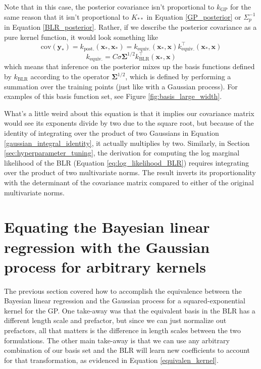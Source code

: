 \documentclass{article}
\begin{document}
Note that in this case, the posterior covariance isn't proportional to $k_\text{GP}$ for the same reason that it isn't proportional to $K_{\ast\ast}$ in Equation \ref{GP_posterior} or $\Sigma_p^{-1}$ in Equation \ref{BLR_posterior}. Rather, if we describe the posterior covariance as a pure kernel function, it would look something like 
\begin{equation}
    \text{cov}(\mathbf{y_\ast})= k_\text{post.}(\mathbf{x}_\ast,\mathbf{x}_\ast) =
    k_\text{equiv.}(\mathbf{x}_\ast,\mathbf{x}) k_\text{equiv.}^\top(\mathbf{x}_\ast,\mathbf{x})
\end{equation}\begin{equation}
\label{equivalen_kernel}
    k_\text{equiv.} = C\sigma\boldsymbol{\Sigma}^{1/2}k_\text{BLR}^\top(\mathbf{x}_\ast,\mathbf{x})
\end{equation}which means that inference on the posterior mixes up the basis functions defined by $k_\text{BLR}$ according to the operator $\boldsymbol{\Sigma}^{1/2}$, which is defined by performing a summation over the training points (just like with a Gaussian process).  For examples of this basis function set, see Figure \ref{fig:basis_large_width}.

What's a little weird about this equation is that it implies our covariance matrix would see its exponents divide by two due to the square root, but because of the identity of integrating over the product of two Gaussians in Equation \ref{gaussian_integral_identity}, it actually multiplies by two. Similarly, in Section \ref{sec:hyperparameter_tuning}, the derivation for computing the log marginal likelihood of the BLR (Equation \ref{eq:log_likelihood_BLR}) requires integrating over the product of two multivariate norms. The result inverts its proportionality with the determinant of the covariance matrix compared to either of the original multivariate norms.

\section{Equating the Bayesian linear regression with the Gaussian process for arbitrary kernels}

The previous section covered how to accomplish the equivalence between the Bayesian linear regression and the Gaussian process for a squared-exponential kernel for the GP. One take-away was that the equivalent basis in the BLR has a different length scale and prefactor, but since we can just normalize out prefactors, all that matters is the difference in length scales between the two formulations. The other main take-away is that we can use any arbitrary combination of our basis set and the BLR will learn new coefficients to account for that transformation, as evidenced in Equation \ref{equivalen_kernel}.
\end{document}
